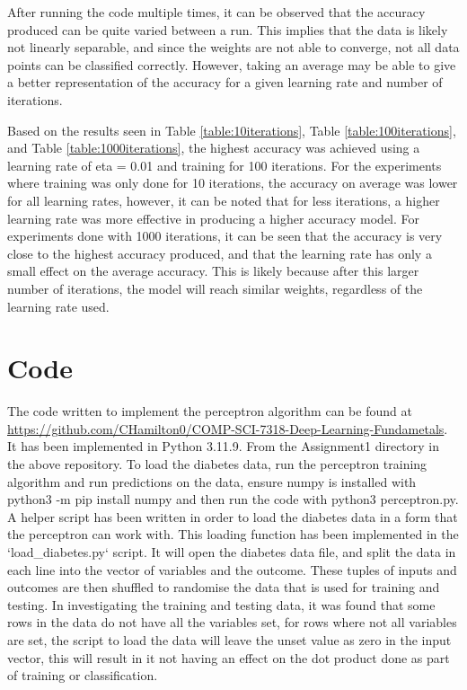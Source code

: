 \documentclass[10pt,twocolumn,a4paper]{article}
\begin{document}
After running the code multiple times, it can be observed that the accuracy produced can be quite varied between a run. This implies that the data is likely not linearly separable, and since the weights are not able to converge, not all data points can be classified correctly. However, taking an average may be able to give a better representation of the accuracy for a given learning rate and number of iterations.

Based on the results seen in Table \ref{table:10iterations}, Table \ref{table:100iterations}, and Table \ref{table:1000iterations}, the highest accuracy was achieved using a learning rate of eta = 0.01 and training for 100 iterations. For the experiments where training was only done for 10 iterations, the accuracy on average was lower for all learning rates, however, it can be noted that for less iterations, a higher learning rate was more effective in producing a higher accuracy model. For experiments done with 1000 iterations, it can be seen that the accuracy is very close to the highest accuracy produced, and that the learning rate has only a small effect on the average accuracy. This is likely because after this larger number of iterations, the model will reach similar weights, regardless of the learning rate used.


\section{Code}

The code written to implement the perceptron algorithm can be found at \url{https://github.com/CHamilton0/COMP-SCI-7318-Deep-Learning-Fundametals}. It has been implemented in Python 3.11.9. From the Assignment1 directory in the above repository. To load the diabetes data, run the perceptron training algorithm and run predictions on the data, ensure numpy is installed with python3 -m pip install numpy and then run the code with python3 perceptron.py. A helper script has been written in order to load the diabetes data in a form that the perceptron can work with. This loading function has been implemented in the `load\_diabetes.py` script. It will open the diabetes data file, and split the data in each line into the vector of variables and the outcome. These tuples of inputs and outcomes are then shuffled to randomise the data that is used for training and testing. In investigating the training and testing data, it was found that some rows in the data do not have all the variables set, for rows where not all variables are set, the script to load the data will leave the unset value as zero in the input vector, this will result in it not having an effect on the dot product done as part of training or classification. 
\end{document}
